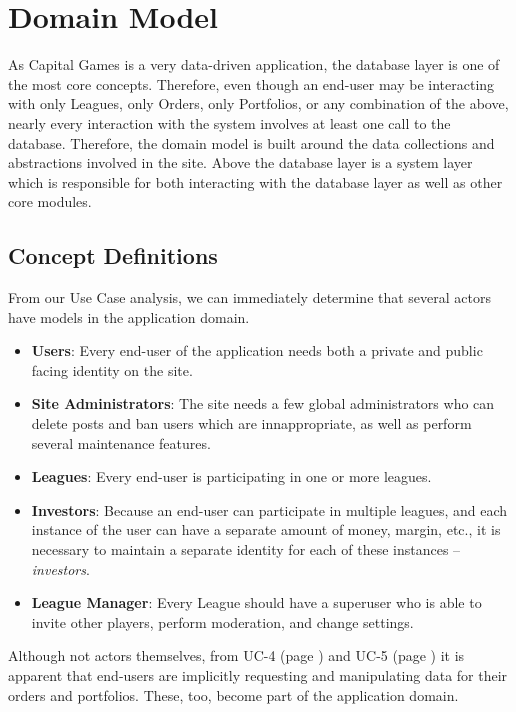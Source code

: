 \chapter{Domain Model}

As Capital Games is a very data-driven application, the database layer is
one of the most core concepts. Therefore, even though an end-user may
be interacting with only Leagues, only Orders, only Portfolios, or any
combination of the above, nearly every interaction with the system
involves at least one call to the database. Therefore, the domain model
is built around the data collections and abstractions involved in the site.
Above the database layer is a system layer which is responsible for both
interacting with the database layer as well as other core modules.


\section{Concept Definitions}

From our Use Case analysis, we can immediately determine that several
actors have models in the application domain.

\begin{itemize}
\item \textbf{Users}: Every end-user of the application needs both a private and
public facing identity on the site.

\item \textbf{Site Administrators}: The site needs a few global administrators
who can delete posts and ban users which are innappropriate, as well
as perform several maintenance features.

\item \textbf{Leagues}: Every end-user is participating in one or more leagues.

\item \textbf{Investors}: Because an end-user can participate in multiple leagues,
and each instance of the user can have a separate amount of money, margin,
etc., it is necessary to maintain a separate identity for each of these 
instances -- \emph{investors}.

\item \textbf{League Manager}: Every League should have a superuser who is 
able to invite other players, perform moderation, and change settings.
\end{itemize}

Although not actors themselves, from UC-4 (page \pageref{UC-4}) and UC-5 
(page \pageref{UC-5}) it is apparent that end-users are implicitly 
requesting and manipulating data for their orders and portfolios. These,
too, become part of the application domain.

